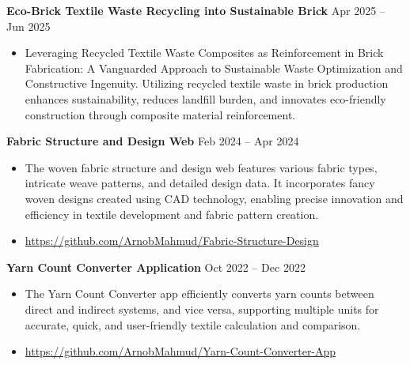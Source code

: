 

{\textbf{Eco-Brick \textbar{} Textile Waste Recycling into Sustainable Brick}} \hfill Apr 2025 – Jun 2025\\

\begin{itemize}
\item 
\vspace{-2mm}
\begin{justify}Leveraging Recycled Textile Waste Composites as Reinforcement in Brick Fabrication: A Vanguarded Approach to Sustainable Waste Optimization and Constructive Ingenuity. Utilizing recycled textile waste in brick production enhances sustainability, reduces landfill burden, and innovates eco-friendly construction through composite material reinforcement.
\end{justify}
\end{itemize}

{\textbf{Fabric Structure and Design Web}} \hfill  Feb 2024 – Apr 2024\\
\begin{itemize}
\vspace{-2mm}
    \item 
    \begin{justify}The woven fabric structure and design web features various fabric types, intricate weave patterns, and detailed design data. It incorporates fancy woven designs created using CAD technology, enabling precise innovation and efficiency in textile development and fabric pattern creation.
    \end{justify}
\vspace{-2mm}
    \item \href{https://github.com/ArnobMahmud/Fabric-Structure-Design}{https://github.com/ArnobMahmud/Fabric-Structure-Design}
\end{itemize}

{\textbf{Yarn Count Converter Application}} \hfill Oct 2022 – Dec 2022\\
\begin{itemize}
\item  
\vspace{-2mm}
\begin{justify}The Yarn Count Converter app efficiently converts yarn counts between direct and indirect systems,
 and vice versa, supporting multiple units for accurate, quick, and user-friendly textile calculation and comparison.
 \end{justify}
 \item 
\vspace{-2mm} 
\href{https://github.com/ArnobMahmud/Yarn-Count-Converter-App}{https://github.com/ArnobMahmud/Yarn-Count-Converter-App}

\end{itemize}
